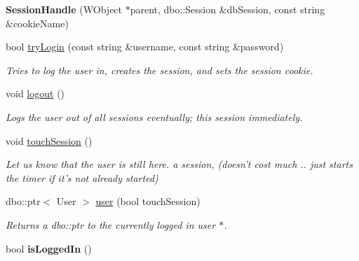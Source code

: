 \begin{DoxyCompactItemize}
\item 
\hypertarget{classwittyPlus_1_1SessionHandle_aeee5808fe99d7814d08e7becf8df483b}{
{\bfseries SessionHandle} (WObject $\ast$parent, dbo::Session \&dbSession, const string \&cookieName)}
\label{classwittyPlus_1_1SessionHandle_aeee5808fe99d7814d08e7becf8df483b}

\item 
bool \hyperlink{classwittyPlus_1_1SessionHandle_a76faab031151971ad6147b92c97bae3b}{tryLogin} (const string \&username, const string \&password)
\begin{DoxyCompactList}\small\item\em Tries to log the user in, creates the session, and sets the session cookie. \item\end{DoxyCompactList}\item 
void \hyperlink{classwittyPlus_1_1SessionHandle_aa007acd765744388e75349b2dcdd3f5d}{logout} ()
\begin{DoxyCompactList}\small\item\em Logs the user out of all sessions eventually; this session immediately. \item\end{DoxyCompactList}\item 
void \hyperlink{classwittyPlus_1_1SessionHandle_a3bd4c9d89606f2abf4a5048e876d0c18}{touchSession} ()
\begin{DoxyCompactList}\small\item\em Let us know that the user is still here. a session, (doesn't cost much .. just starts the timer if it's not already started) \item\end{DoxyCompactList}\item 
dbo::ptr$<$ User $>$ \hyperlink{classwittyPlus_1_1SessionHandle_a383c9e4f8ed9ec9d6ffcd1613a882938}{user} (bool touchSession)
\begin{DoxyCompactList}\small\item\em Returns a dbo::ptr to the currently logged in user $\ast$. \item\end{DoxyCompactList}\item 
\hypertarget{classwittyPlus_1_1SessionHandle_a84695936a436dd197b9674191da956f4}{
bool {\bfseries isLoggedIn} ()}
\label{classwittyPlus_1_1SessionHandle_a84695936a436dd197b9674191da956f4}

\end{DoxyCompactItemize}



